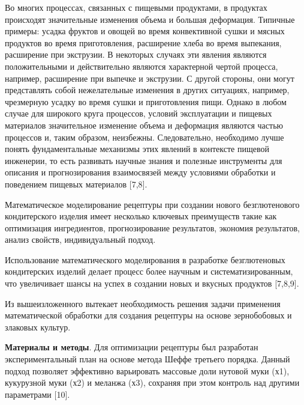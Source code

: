 \begin{multicols}{2}
Во многих процессах, связанных с пищевыми продуктами, в продуктах
происходят значительные изменения объема и большая деформация. Типичные
примеры: усадка фруктов и овощей во время конвективной сушки и мясных
продуктов во время приготовления, расширение хлеба во время выпекания,
расширение при экструзии. В некоторых случаях эти явления являются
положительными и действительно являются характерной чертой процесса,
например, расширение при выпечке и экструзии. С другой стороны, они
могут представлять собой нежелательные изменения в других ситуациях,
например, чрезмерную усадку во время сушки и приготовления пищи. Однако
в любом случае для широкого круга процессов, условий эксплуатации и
пищевых материалов значительное изменение объема и деформация являются
частью процессов и, таким образом, неизбежны. Следовательно, необходимо
лучше понять фундаментальные механизмы этих явлений в контексте пищевой
инженерии, то есть развивать научные знания и полезные инструменты для
описания и прогнозирования взаимосвязей между условиями обработки и
поведением пищевых материалов {[}7,8{]}.

Математическое моделирование рецептуры при создании нового
безглютенового кондитерского изделия имеет несколько ключевых
преимуществ такие как оптимизация ингредиентов, прогнозирование
результатов, экономия результатов, анализ свойств, индивидуальный
подход.

Использование математического моделирования в разработке безглютеновых
кондитерских изделий делает процесс более научным и систематизированным,
что увеличивает шансы на успех в создании новых и вкусных продуктов
{[}7,8,9{]}.

Из вышеизложенного вытекает необходимость решения задачи применения
математической обработки для создания рецептуры на основе зернобобовых и
злаковых культур.

{\bfseries Материалы и методы}. Для оптимизации рецептуры был разработан
экспериментальный план на основе метода Шеффе третьего порядка. Данный
подход позволяет эффективно варьировать массовые доли нутовой муки (х1),
кукурузной муки (х2) и меланжа (х3), сохраняя при этом контроль над
другими параметрами {[}10{]}.
\end{multicols}

